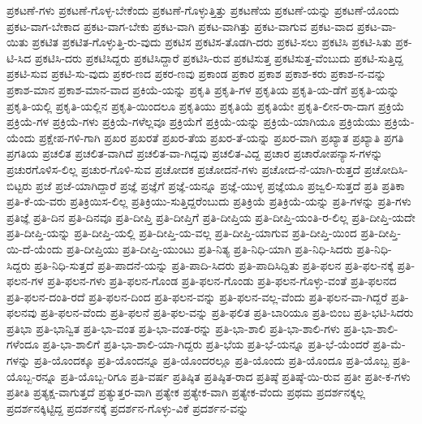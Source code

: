 {ಪ್ರಕಟಣೆ-ಗಳು
ಪ್ರಕಟಣೆ-ಗೊಳ್ಳ-ಬೇಕೆಂದು
ಪ್ರಕಟಣೆ-ಗೊಳ್ಳುತ್ತಿತ್ತು
ಪ್ರಕಟಣೆಯ
ಪ್ರಕಟಣೆ-ಯನ್ನು
ಪ್ರಕಟಣೆ-ಯೊಂದು
ಪ್ರಕಟ-ವಾಗ-ಬೇಕಾದ
ಪ್ರಕಟ-ವಾಗ-ಬೇಕು
ಪ್ರಕಟ-ವಾಗಿ
ಪ್ರಕಟ-ವಾಗಿತ್ತು
ಪ್ರಕಟ-ವಾಗುವ
ಪ್ರಕಟ-ವಾದ
ಪ್ರಕಟ-ವಾ-ಯಿತು
ಪ್ರಕಟಿತ
ಪ್ರಕಟಿತ-ಗೊಳ್ಳುತ್ತಿ-ರು-ವುದು
ಪ್ರಕಟಿಸ
ಪ್ರಕಟಿಸ-ತೊಡಗಿ-ದರು
ಪ್ರಕಟಿ-ಸಲು
ಪ್ರಕಟಿಸಿ
ಪ್ರಕಟಿ-ಸಿತು
ಪ್ರಕ-ಟಿ-ಸಿದ
ಪ್ರಕಟಿಸಿ-ದರು
ಪ್ರಕಟಿಸಿದ್ದರು
ಪ್ರಕಟಿಸಿದ್ದಾರೆ
ಪ್ರಕಟಿಸಿ-ರುವ
ಪ್ರಕಟಿಸುತ್ತ
ಪ್ರಕಟಿಸುತ್ತ-ವೆಂಬುದು
ಪ್ರಕಟಿ-ಸುತ್ತಿದ್ದ
ಪ್ರಕಟಿ-ಸುವ
ಪ್ರಕಟಿ-ಸು-ವುದು
ಪ್ರಕರ-ಣದ
ಪ್ರಕರ-ಣವು
ಪ್ರಕಾಂಡ
ಪ್ರಕಾರ
ಪ್ರಕಾಶ
ಪ್ರಕಾಶ-ಕರು
ಪ್ರಕಾಶ-ನ-ವನ್ನು
ಪ್ರಕಾಶ-ಮಾನ
ಪ್ರಕಾಶ-ಮಾನ-ವಾದ
ಪ್ರಕಿಯೆ-ಯನ್ನು
ಪ್ರಕೃತಿ
ಪ್ರಕೃತಿ-ಗಳ
ಪ್ರಕೃತಿಯ
ಪ್ರಕೃತಿ-ಯ-ಡೆಗೆ
ಪ್ರಕೃತಿ-ಯನ್ನು
ಪ್ರಕೃತಿ-ಯಲ್ಲಿ
ಪ್ರಕೃತಿ-ಯಲ್ಲಿನ
ಪ್ರಕೃತಿ-ಯಿಂದಲೂ
ಪ್ರಕೃತಿಯು
ಪ್ರಕೃತಿಯೆ
ಪ್ರಕೃತಿಯೇ
ಪ್ರಕೃತಿ-ಲೀನ-ರಾ-ದಾಗ
ಪ್ರಕ್ರಿಯೆ
ಪ್ರಕ್ರಿಯೆ-ಗಳ
ಪ್ರಕ್ರಿಯೆ-ಗಳು
ಪ್ರಕ್ರಿಯೆ-ಗಳೆಲ್ಲವೂ
ಪ್ರಕ್ರಿಯೆಗೆ
ಪ್ರಕ್ರಿಯೆ-ಯನ್ನು
ಪ್ರಕ್ರಿಯೆ-ಯಾಗಿಯೂ
ಪ್ರಕ್ರಿಯೆಯು
ಪ್ರಕ್ರಿಯೆ-ಯೆಂದು
ಪ್ರಕ್ಷೇಪ-ಗಳಿ-ಗಾಗಿ
ಪ್ರಖರ
ಪ್ರಖರತೆ
ಪ್ರಖರ-ತೆಯ
ಪ್ರಖರ-ತೆ-ಯನ್ನು
ಪ್ರಖರ-ವಾಗಿ
ಪ್ರಖ್ಯಾತ
ಪ್ರಖ್ಯಾತಿ
ಪ್ರಗತಿ
ಪ್ರಗತಿಯ
ಪ್ರಚಲಿತ
ಪ್ರಚಲಿತ-ವಾಗಿದೆ
ಪ್ರಚಲಿತ-ವಾ-ಗಿದ್ದವು
ಪ್ರಚಲಿತ-ವಿದ್ದ
ಪ್ರಚಾರ
ಪ್ರಚಾರೋಪನ್ಯಾಸ-ಗಳನ್ನು
ಪ್ರಚುರಗೊಳಿಸ-ಲಿಲ್ಲ
ಪ್ರಚುರ-ಗೊಳಿ-ಸುವ
ಪ್ರಚೋದಕ
ಪ್ರಚೋದನೆ-ಗಳು
ಪ್ರಚೋದ-ನೆ-ಯಾಗಿ-ರುತ್ತದೆ
ಪ್ರಚೋದಿಸಿ-ಬಿಟ್ಟರು
ಪ್ರಜೆ
ಪ್ರಜೆ-ಯಾಗಿದ್ದಾರೆ
ಪ್ರಜ್ಞೆ
ಪ್ರಜ್ಞೆಗೆ
ಪ್ರಜ್ಞೆ-ಯನ್ನೂ
ಪ್ರಜ್ಞೆ-ಯುಳ್ಳ
ಪ್ರಜ್ಞೆಯೂ
ಪ್ರಜ್ವಲಿ-ಸುತ್ತದೆ
ಪ್ರತಿ
ಪ್ರತಿಕಾ
ಪ್ರತಿ-ಕೆ-ಯ-ವರು
ಪ್ರತಿಕ್ರಿಯಿಸ-ಲಿಲ್ಲ
ಪ್ರತಿಕ್ರಿಯು-ಸುತ್ತಿದ್ದರೆಂಬುದು
ಪ್ರತಿಕ್ರಿಯೆ
ಪ್ರತಿಕ್ರಿಯೆ-ಯನ್ನು
ಪ್ರತಿ-ಗಳನ್ನು
ಪ್ರತಿ-ಗಳು
ಪ್ರತಿಜ್ಞೆ
ಪ್ರತಿ-ದಿನ
ಪ್ರತಿ-ದಿನವೂ
ಪ್ರತಿ-ದೀಪ್ತಿ
ಪ್ರತಿ-ದೀಪ್ತಿಗೆ
ಪ್ರತಿ-ದೀಪ್ತಿಯ
ಪ್ರತಿ-ದೀಪ್ತಿ-ಯಂತಿ-ರ-ಲಿಲ್ಲ
ಪ್ರತಿ-ದೀಪ್ತಿ-ಯದೇ
ಪ್ರತಿ-ದೀಪ್ತಿ-ಯನ್ನು
ಪ್ರತಿ-ದೀಪ್ತಿ-ಯಲ್ಲಿ
ಪ್ರತಿ-ದೀಪ್ತಿ-ಯ-ವಲ್ಲ
ಪ್ರತಿ-ದೀಪ್ತಿ-ಯಾಗುವ
ಪ್ರತಿ-ದೀಪ್ತಿ-ಯಿಂದ
ಪ್ರತಿ-ದೀಪ್ತಿ-ಯಿ-ದೆ-ಯೆಂದು
ಪ್ರತಿ-ದೀಪ್ತಿಯು
ಪ್ರತಿ-ದೀಪ್ತಿ-ಯುಂಟು
ಪ್ರತಿ-ನಿತ್ಯ
ಪ್ರತಿ-ನಿಧಿ-ಯಾಗಿ
ಪ್ರತಿ-ನಿಧಿ-ಸಿದರು
ಪ್ರತಿ-ನಿಧಿ-ಸಿದ್ದರು
ಪ್ರತಿ-ನಿಧಿ-ಸುತ್ತದೆ
ಪ್ರತಿ-ಪಾದನೆ-ಯನ್ನು
ಪ್ರತಿ-ಪಾದಿ-ಸಿದರು
ಪ್ರತಿ-ಪಾದಿಸಿದ್ದಿತು
ಪ್ರತಿ-ಫಲನ
ಪ್ರತಿ-ಫಲ-ನಕ್ಕೆ
ಪ್ರತಿ-ಫಲನ-ಗಳ
ಪ್ರತಿ-ಫಲನ-ಗಳು
ಪ್ರತಿ-ಫಲನ-ಗೊಂಡ
ಪ್ರತಿ-ಫಲನ-ಗೊಂಡು
ಪ್ರತಿ-ಫಲನ-ಗೊಳ್ಳು-ವಂತೆ
ಪ್ರತಿ-ಫಲನದ
ಪ್ರತಿ-ಫಲನ-ದಂತಿ-ರದೆ
ಪ್ರತಿ-ಫಲನ-ದಿಂದ
ಪ್ರತಿ-ಫಲನ-ವನ್ನು
ಪ್ರತಿ-ಫಲನ-ವಲ್ಲ-ವೆಂದು
ಪ್ರತಿ-ಫಲನ-ವಾ-ಗಿದ್ದರೆ
ಪ್ರತಿ-ಫಲನವು
ಪ್ರತಿ-ಫಲನ-ವೆಂದು
ಪ್ರತಿ-ಫಲನೆ
ಪ್ರತಿ-ಫಲ-ವನ್ನು
ಪ್ರತಿ-ಫಲಿತ
ಪ್ರತಿ-ಬಾರಿಯೂ
ಪ್ರತಿ-ಬಿಂಬ
ಪ್ರತಿ-ಭಟಿ-ಸಿದರು
ಪ್ರತಿಭಾ
ಪ್ರತಿ-ಭಾನ್ವಿತ
ಪ್ರತಿ-ಭಾ-ವಂತ
ಪ್ರತಿ-ಭಾ-ವಂತ-ರನ್ನು
ಪ್ರತಿ-ಭಾ-ಶಾಲಿ
ಪ್ರತಿ-ಭಾ-ಶಾಲಿ-ಗಳು
ಪ್ರತಿ-ಭಾ-ಶಾಲಿ-ಗಳೆಂದೂ
ಪ್ರತಿ-ಭಾ-ಶಾಲಿಗೆ
ಪ್ರತಿ-ಭಾ-ಶಾಲಿ-ಯಾ-ಗಿದ್ದರು
ಪ್ರತಿ-ಭೆಯ
ಪ್ರತಿ-ಭೆ-ಯನ್ನೂ
ಪ್ರತಿ-ಭೆ-ಯೆಂದರೆ
ಪ್ರತಿ-ಮೆ-ಗಳನ್ನು
ಪ್ರತಿ-ಯೊಂದಕ್ಕೂ
ಪ್ರತಿ-ಯೊಂದನ್ನೂ
ಪ್ರತಿ-ಯೊಂದರಲ್ಲೂ
ಪ್ರತಿ-ಯೊಂದು
ಪ್ರತಿ-ಯೊಂದೂ
ಪ್ರತಿ-ಯೊಬ್ಬ
ಪ್ರತಿ-ಯೊಬ್ಬ-ರನ್ನೂ
ಪ್ರತಿ-ಯೊಬ್ಬ-ರಿಗೂ
ಪ್ರತಿ-ವರ್ಷ
ಪ್ರತಿಷ್ಠಿತ
ಪ್ರತಿಷ್ಠಿತ-ರಾದ
ಪ್ರತಿಷ್ಠೆ
ಪ್ರತಿಷ್ಠೆ-ಯಿ-ರುವ
ಪ್ರತೀ
ಪ್ರತೀ-ಕ-ಗಳು
ಪ್ರತೀತಿ
ಪ್ರತ್ಯಕ್ಷ-ವಾಗುತ್ತದೆ
ಪ್ರತ್ಯುತ್ತರ-ವಾಗಿ
ಪ್ರತ್ಯೇಕ
ಪ್ರತ್ಯೇಕ-ವಾಗಿ
ಪ್ರತ್ಯೇಕ-ವೆಂದು
ಪ್ರಥಮ
ಪ್ರದರ್ಶನಕ್ಕಲ್ಲ
ಪ್ರದರ್ಶನಕ್ಕಿಟ್ಟಿದ್ದ
ಪ್ರದರ್ಶನಕ್ಕೆ
ಪ್ರದರ್ಶನ-ಗೊಳ್ಳು-ವಿಕೆ
ಪ್ರದರ್ಶನ-ವನ್ನು
}
